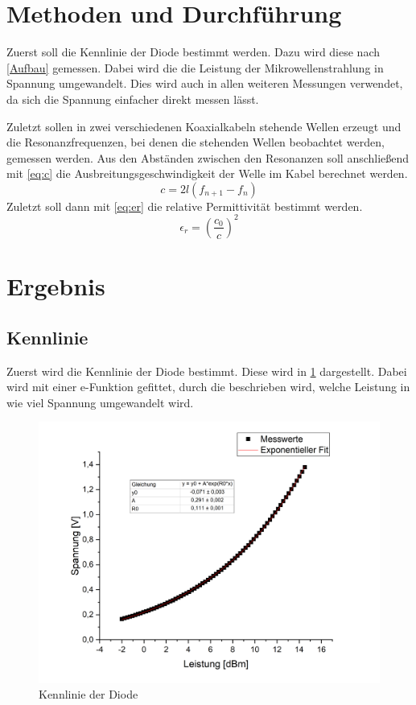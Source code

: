 \section{Methoden und Durchführung}
Zuerst soll die Kennlinie der Diode bestimmt werden. Dazu wird diese nach \cref{Aufbau} gemessen. Dabei wird die die Leistung der Mikrowellenstrahlung in Spannung umgewandelt. Dies wird auch in allen weiteren Messungen verwendet, da sich die Spannung einfacher direkt messen lässt.


Zuletzt sollen in zwei verschiedenen Koaxialkabeln stehende Wellen erzeugt und die Resonanzfrequenzen, bei denen die stehenden Wellen beobachtet werden, gemessen werden. Aus den Abständen zwischen den Resonanzen soll anschließend mit \cref{eq:c} die Ausbreitungsgeschwindigkeit der Welle im Kabel berechnet werden.
\begin{equation}
c = 2l(f_{n+1} - f_n)
\label{eq:c}
\end{equation}
Zuletzt soll dann mit \cref{eq:er} die relative Permittivität bestimmt werden.
\begin{equation}
\epsilon_r = \left( \frac{c_0}{c}\right) ^2
\label{eq:er}
\end{equation}

\section{Ergebnis}
\subsection{Kennlinie}
Zuerst wird die Kennlinie der Diode bestimmt. Diese wird in \cref{fuck_scidavis} dargestellt. Dabei wird mit einer e-Funktion gefittet, durch die beschrieben wird, welche Leistung in wie viel Spannung umgewandelt wird. 

\begin{figure}[h]
	\centering
	\includegraphics[scale=0.4]{fuck_scidavis.PNG}
	\caption{Kennlinie der Diode}
	\label{fuck_scidavis}
\end{figure}


